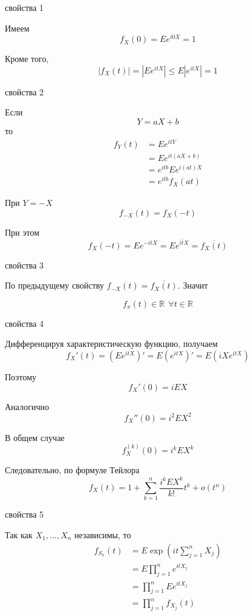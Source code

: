 \documentclass[12pt,a4paper]{article}
\begin{document}
\begin{proofbox}{свойства 1}

Имеем
\[
f_X(0)
=
Ee^{i0X}
=
1
\]

Кроме того,
\[
|f_X(t)|
=
|Ee^{itX}|
\leq
E|e^{itX}|
=
1
\]

\end{proofbox}

\begin{proofbox}{свойства 2}

Если
\[
Y=aX+b
\]
то
\[
\begin{aligned}
f_Y(t)
&=
Ee^{itY}\\
&=
Ee^{it(aX+b)}\\
&=
e^{itb}Ee^{i(at)X}\\
&=
e^{itb}f_X(at)
\end{aligned}
\]

При $Y=-X$
\[
f_{-X}(t)
=
f_X(-t)
\]

При этом
\[
f_X(-t)
=
Ee^{-itX}
=
E\overline{e^{itX}}
=
\overline{f_X(t)}
\]

\end{proofbox}

\begin{proofbox}{свойства 3}

По предыдущему свойству $f_{-X}(t) = \overline{f_X(t)}$. Значит

\[
f_x(t) \in \mathbb{R} \ \ \forall t\in\mathbb{R}
\]

\end{proofbox}

\begin{proofbox}{свойства 4}

Дифференцируя характеристическую функцию, получаем
\[
f_X'(t)
=
\left(Ee^{itX}\right)'
=
E\left(e^{itX}\right)'
=
E\left(iXe^{itX}\right)
\]

Поэтому
\[
f_X'(0)
=
iEX
\]

Аналогично
\[
f_X''(0)
=
i^2EX^2
\]

В общем случае
\[
f_X^{(k)}(0)
=
i^kEX^k
\]

Следовательно, по формуле Тейлора
\[
f_X(t)
=
1+
\sum_{k=1}^n
\frac{i^kEX^k}{k!}t^k
+
o(t^n)
\]

\end{proofbox}

\begin{proofbox}{свойства 5}

Так как $X_1,\ldots,X_n$ независимы, то
\[
\begin{aligned}
f_{S_n}(t)
&=
E\exp\left(
it\sum_{j=1}^nX_j
\right)\\
&=
E\prod_{j=1}^ne^{itX_j}\\
&=
\prod_{j=1}^nEe^{itX_j}\\
&=
\prod_{j=1}^nf_{X_j}(t)
\end{aligned}
\]

\end{proofbox}
\end{document}
